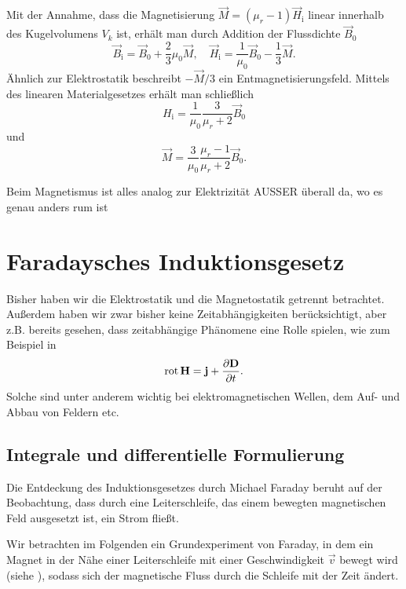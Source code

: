 \begin{itemize}
	      Mit der Annahme, dass die Magnetisierung $\vec {M}=\left(\mu _{r}-1\right)\vec {H}_{\mathrm{i}}$ linear innerhalb des Kugelvolumens $V_{k}$ ist, erhält man durch Addition der Flussdichte $\vec {B}_{0}$
	      \begin{equation*}
		      \vec {B}_{\mathrm{i}}=\vec {B}_{0}+\frac{2}{3}\mu _{0}\vec {M},\quad \vec {H}_{\mathrm{i}}=\frac{1}{\mu _{0}}\vec {B}_{0}-\frac{1}{3}\vec {M}.
	      \end{equation*}
	      Ähnlich zur Elektrostatik beschreibt $-\vec {M}/3$ ein Entmagnetisierungsfeld. Mittels des linearen Materialgesetzes erhält man schließlich
	      \begin{equation*}
		      H_{\mathrm{i}}=\frac{1}{\mu _{0}}\frac{3}{\mu _{r}+2}\vec {B}_{0}
	      \end{equation*}
	      und
	      \begin{equation*}
		      \vec {M}=\frac{3}{\mu _{0}}\frac{\mu _{r}-1}{\mu _{r}+2}\vec {B}_{0}.
	      \end{equation*}
\end{itemize}

Beim Magnetismus ist alles analog zur Elektrizität AUSSER überall da, wo es genau anders rum ist

\section{Faradaysches Induktionsgesetz}

Bisher haben wir die Elektrostatik und die Magnetostatik getrennt betrachtet. Außerdem haben wir zwar bisher keine Zeitabhängigkeiten berücksichtigt, aber z.B. bereits gesehen, dass zeitabhängige Phänomene eine Rolle spielen, wie zum Beispiel in
\begin{equation*}
	\operatorname{rot} \mathbf{H}=\mathbf{j}+\frac{\partial \mathbf{D}}{\partial t}.
\end{equation*}
Solche sind unter anderem wichtig bei elektromagnetischen Wellen, dem Auf- und Abbau von Feldern etc.

\subsection{Integrale und differentielle Formulierung}

Die Entdeckung des Induktionsgesetzes durch Michael Faraday beruht auf der Beobachtung, dass durch eine Leiterschleife, das einem bewegten magnetischen Feld ausgesetzt ist, ein Strom fließt.

Wir betrachten im Folgenden ein Grundexperiment von Faraday, in dem ein Magnet in der Nähe einer Leiterschleife mit einer Geschwindigkeit $\vec v$ bewegt wird (siehe ), sodass sich der magnetische Fluss durch die Schleife mit der Zeit ändert. 

